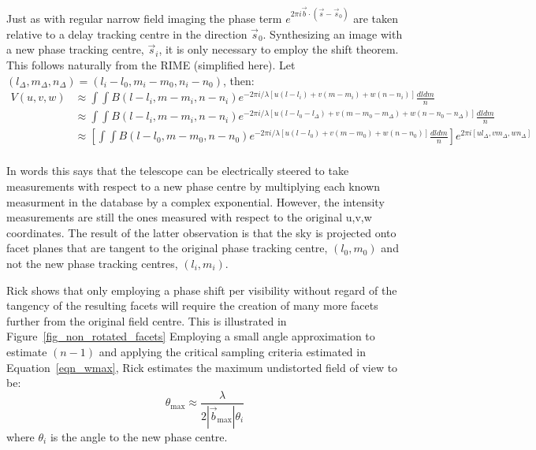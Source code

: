 Just as with regular narrow field imaging the phase term $e^{2\pi i \vec{b}\cdot(\vec{s}-\vec{s}_0)}$ are taken relative to a delay tracking centre in the direction
$\vec{s}_0$. Synthesizing an image with a new phase tracking centre, $\vec{s}_i$, it is only necessary to employ the shift theorem. This follows naturally from the
RIME (simplified here). Let $(l_\Delta,m_\Delta,n_\Delta) = (l_i-l_0,m_i-m_0,n_i-n_0)$, then:
\begin{equation}
  \label{eqn_faceting}
  \begin{split}
    V(u,v,w)&\approx\int{\int{B(l-l_i,m-m_i,n-n_i)e^{-2{\pi}i/\lambda[u(l-l_i)+v(m-m_i)+w(n-n_i)]}\frac{dldm}{n}}}\\
    &\approx\int{\int{B(l-l_i,m-m_i,n-n_i)e^{-2{\pi}i/\lambda[u(l-l_0-l_\Delta)+v(m-m_0-m_\Delta)+w(n-n_0-n_\Delta)]}\frac{dldm}{n}}}\\
    &\approx\left[\int{\int{B(l-l_0,m-m_0,n-n_0)e^{-2{\pi}i/\lambda[u(l-l_0)+v(m-m_0)+w(n-n_0)]}\frac{dldm}{n}}}\right]e^{2{\pi}i[ul_\Delta,vm_\Delta,wn_\Delta]}\\
  \end{split}
\end{equation}

In words this says that the telescope can be electrically steered to take measurements with respect to a new phase centre by multiplying each known measurment in
the database by a complex exponential. However, the intensity measurements are still the ones measured with respect to the original u,v,w coordinates. The result of
the latter observation is that the sky is projected onto facet planes that are tangent to the original phase tracking centre, $(l_0,m_0)$ and not the new phase 
tracking centres, $(l_i,m_i)$.

Rick shows that only employing a phase shift per visibility without regard of the tangency of the resulting facets will require the creation of many more facets 
further from the original field centre. This is illustrated in Figure~\ref{fig_non_rotated_facets} Employing a small angle approximation to estimate $(n-1)$ and applying the critical sampling criteria estimated in 
Equation~\ref{eqn_wmax}, Rick estimates the maximum undistorted field of view to be:
\begin{equation}
 \theta_{\text{max}} \approx \frac{\lambda}{2|\vec{b}_{\text{max}}|\theta_i}
\end{equation}
where $\theta_i$ is the angle to the new phase centre.

